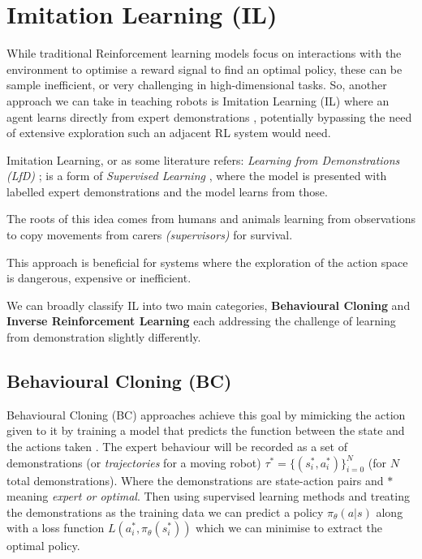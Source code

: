 \section{Imitation Learning (IL)}
  While traditional Reinforcement learning models focus on interactions with the environment to optimise a reward signal to find an optimal policy, these can be sample inefficient, or very challenging in high-dimensional tasks. So, another approach we can take in teaching robots is Imitation Learning (IL) where an agent learns directly from expert demonstrations \cite{attia2018globaloverviewimitationlearning}, potentially bypassing the need of extensive exploration such an adjacent RL system would need.

  Imitation Learning, or as some literature refers: \emph{Learning from Demonstrations (LfD)} \cite{ARGALL2009469}; is a form of \emph{Supervised Learning} \cite{hastie2009overview,cunningham2008supervised}, where the model is presented with labelled expert demonstrations and the model learns from those.
  
  The roots of this idea comes from humans and animals \cite{bakker1996robot} learning from observations to copy movements from carers \emph{(supervisors)} for survival. 

  This approach is beneficial for systems where the exploration of the action space is dangerous, expensive or inefficient.

  We can broadly classify IL into two main categories, \textbf{Behavioural Cloning} and \textbf{Inverse Reinforcement Learning} each addressing the challenge of learning from demonstration slightly differently.


\subsection{Behavioural Cloning (BC)}
\label{subseq:bc}
 Behavioural Cloning (BC) approaches achieve this goal by  mimicking the action given to it by training a model that predicts the function between the state and the actions taken  \cite{pomerlau1991neco.1991.3.1.88, ross2011reductionimitationlearningstructured}. The expert behaviour will be recorded as a set of demonstrations (or \emph{trajectories} for a moving robot) $\tau^* = \lbrace(s_i^*, a_i^*)\rbrace_{i = 0}^N$ (for $N$ total demonstrations). Where the demonstrations are state-action pairs and \emph{$*$} meaning \emph{expert or optimal}.
 Then using supervised learning methods and treating the demonstrations as the training  data we can predict a policy $\pi_\theta\left(a | s\right)$ along with a loss function $L \left( a_i^*, \pi_\theta\left(s_i^*\right) \right)$  which we can minimise to extract the optimal policy. 

